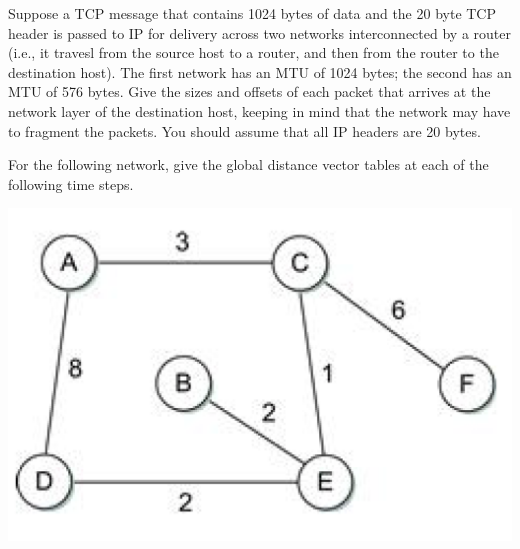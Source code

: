 \documentclass[12pt,addpoints,answers]{exam}
\begin{document}
\begin{questions}
\question[8] Suppose a TCP message that contains 1024 bytes of data and the 20 byte TCP header is passed to IP for delivery across two networks interconnected by a router (i.e., it travesl from the source host to a router, and then from the router to the destination host). The first network has an MTU of 1024 bytes; the second has an MTU of 576 bytes. Give the sizes and offsets of each packet that arrives at the network layer of the destination host, keeping in mind that the network may have to fragment the packets. You should assume that all IP headers are 20 bytes.
\begin{solution}
\end{solution}

\question For the following network, give the global distance vector tables at each of the following time steps.
\begin{center}
\includegraphics[width=0.4\linewidth]{fig/vector.png}
\end{center}


\end{questions}
\end{document}

